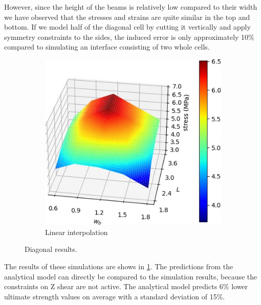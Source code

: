 However, since the height of the beams is relatively low compared to their width we have observed that the stresses and strains are quite similar in the top and bottom.
If we model half of the diagonal cell by cutting it vertically and apply symmetry constraints to the sides,
the induced error is only approximately 10\% compared to simulating an interface consisting of two whole cells.



\begin{figure}
	\centering
	\begin{subfigure}[B]{.49\columnwidth}
		\centering
		\includegraphics[width=\columnwidth]{sources/simulation/diagonal_sim_response.jpg}
		\caption{Linear interpolation}
	\end{subfigure}
	\caption{Diagonal results.}
	\label{fig:sim_diagonal_model}
\end{figure}


The results of these simulations are shows in \cref{fig:sim_diagonal_model}.
The predictions from the analytical model can directly be compared to the simulation results, because the constraints on Z shear are not active.
The analytical model predicts 6\% lower ultimate strength values on average with a standard deviation of 15\%.









